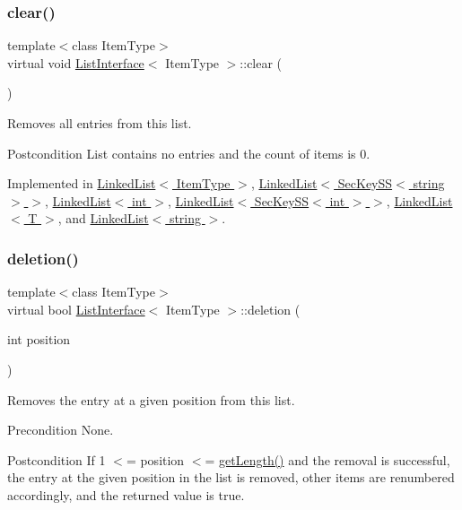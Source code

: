 \subsubsection{\texorpdfstring{clear()}{clear()}}
{\footnotesize\ttfamily template$<$class Item\+Type$>$ \\
virtual void \hyperlink{classListInterface}{List\+Interface}$<$ Item\+Type $>$\+::clear (\begin{DoxyParamCaption}{ }\end{DoxyParamCaption})\hspace{0.3cm}{\ttfamily [pure virtual]}}

Removes all entries from this list. \begin{DoxyPostcond}{Postcondition}
List contains no entries and the count of items is 0. 
\end{DoxyPostcond}


Implemented in \hyperlink{classLinkedList_a7d1d9cf83eef67b6c4d700a3cc5970e1}{Linked\+List$<$ Item\+Type $>$}, \hyperlink{classLinkedList_a7d1d9cf83eef67b6c4d700a3cc5970e1}{Linked\+List$<$ Sec\+Key\+S\+S$<$ string $>$ $>$}, \hyperlink{classLinkedList_a7d1d9cf83eef67b6c4d700a3cc5970e1}{Linked\+List$<$ int $>$}, \hyperlink{classLinkedList_a7d1d9cf83eef67b6c4d700a3cc5970e1}{Linked\+List$<$ Sec\+Key\+S\+S$<$ int $>$ $>$}, \hyperlink{classLinkedList_a7d1d9cf83eef67b6c4d700a3cc5970e1}{Linked\+List$<$ T $>$}, and \hyperlink{classLinkedList_a7d1d9cf83eef67b6c4d700a3cc5970e1}{Linked\+List$<$ string $>$}.

\mbox{\label{classListInterface_a68520ce2942ec716c745b1137c50a3c6}} 
\subsubsection{\texorpdfstring{deletion()}{deletion()}}
{\footnotesize\ttfamily template$<$class Item\+Type$>$ \\
virtual bool \hyperlink{classListInterface}{List\+Interface}$<$ Item\+Type $>$\+::deletion (\begin{DoxyParamCaption}\item[{int}]{position }\end{DoxyParamCaption})\hspace{0.3cm}{\ttfamily [pure virtual]}}

Removes the entry at a given position from this list. \begin{DoxyPrecond}{Precondition}
None. 
\end{DoxyPrecond}
\begin{DoxyPostcond}{Postcondition}
If 1 $<$= position $<$= \hyperlink{classListInterface_afc85695d4137f1e29ff02e179c9f3221}{get\+Length()} and the removal is successful, the entry at the given position in the list is removed, other items are renumbered accordingly, and the returned value is true. 
\end{DoxyPostcond}

